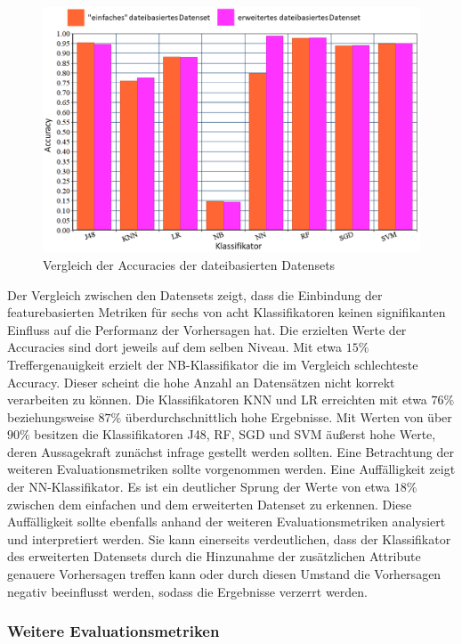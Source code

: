\begin{figure}[h!t]
    \centering
    \includegraphics[width=\textwidth]{images/final_eval}
    \caption{Vergleich der Accuracies der dateibasierten Datensets\label{fig:final-eval}}
\end{figure}

Der Vergleich zwischen den Datensets zeigt, dass die Einbindung der featurebasierten Metriken für sechs von acht Klassifikatoren keinen signifikanten Einfluss auf die Performanz der Vorhersagen hat. Die erzielten Werte der Accuracies sind dort jeweils auf dem selben Niveau. Mit etwa $15\%$ Treffergenauigkeit erzielt der NB-Klassifikator die im Vergleich schlechteste Accuracy. Dieser scheint die hohe Anzahl an Datensätzen nicht korrekt verarbeiten zu können. Die Klassifikatoren KNN und LR erreichten mit etwa $76\%$ beziehungsweise $87\%$ überdurchschnittlich hohe Ergebnisse. Mit Werten von über $90\%$ besitzen die Klassifikatoren J48, RF, SGD und SVM äußerst hohe Werte, deren Aussagekraft zunächst infrage gestellt werden sollten. Eine Betrachtung der weiteren Evaluationsmetriken sollte vorgenommen werden.
Eine Auffälligkeit zeigt der NN-Klassifikator. Es ist ein deutlicher Sprung der Werte von etwa $18\%$ zwischen dem \glqq einfachen\grqq{} und dem erweiterten Datenset zu erkennen. Diese Auffälligkeit sollte ebenfalls anhand der weiteren Evaluationsmetriken analysiert und interpretiert werden. Sie kann einerseits verdeutlichen, dass der Klassifikator des erweiterten Datensets durch die Hinzunahme der zusätzlichen Attribute genauere Vorhersagen treffen kann oder durch diesen Umstand die Vorhersagen negativ beeinflusst werden, sodass die Ergebnisse verzerrt werden.

\subsubsection*{Weitere Evaluationsmetriken}

